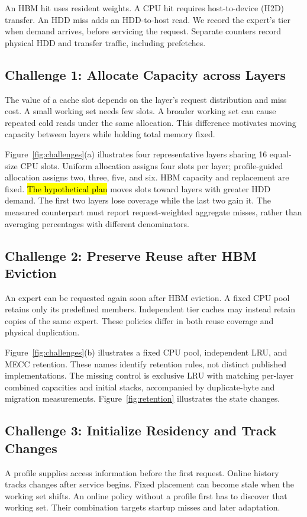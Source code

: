 \documentclass[conference,9pt,letterpaper]{IEEEtran}
\newcommand{\draftnote}[1]{{\sethlcolor{DraftYellow}\hl{#1}}}
\begin{document}
An HBM hit uses resident weights. A CPU hit requires host-to-device (H2D) transfer. An HDD miss adds an HDD-to-host read. We record the expert's tier when demand arrives, before servicing the request. Separate counters record physical HDD and transfer traffic, including prefetches.

\subsection{Challenge 1: Allocate Capacity across Layers}
The value of a cache slot depends on the layer's request distribution and miss cost. A small working set needs few slots. A broader working set can cause repeated cold reads under the same allocation. This difference motivates moving capacity between layers while holding total memory fixed.

Figure~\ref{fig:challenges}(a) illustrates four representative layers sharing 16 equal-size CPU slots. Uniform allocation assigns four slots per layer; profile-guided allocation assigns two, three, five, and six. HBM capacity and replacement are fixed. \draftnote{The hypothetical plan} moves slots toward layers with greater HDD demand. The first two layers lose coverage while the last two gain it. The measured counterpart must report request-weighted aggregate misses, rather than averaging percentages with different denominators.

\subsection{Challenge 2: Preserve Reuse after HBM Eviction}
An expert can be requested again soon after HBM eviction. A fixed CPU pool retains only its predefined members. Independent tier caches may instead retain copies of the same expert. These policies differ in both reuse coverage and physical duplication.

Figure~\ref{fig:challenges}(b) illustrates a fixed CPU pool, independent LRU, and MECC retention. These names identify retention rules, not distinct published implementations. The missing control is exclusive LRU with matching per-layer combined capacities and initial stacks, accompanied by duplicate-byte and migration measurements. Figure~\ref{fig:retention} illustrates the state changes.

\subsection{Challenge 3: Initialize Residency and Track Changes}
A profile supplies access information before the first request. Online history tracks changes after service begins. Fixed placement can become stale when the working set shifts. An online policy without a profile first has to discover that working set. Their combination targets startup misses and later adaptation.
\end{document}
